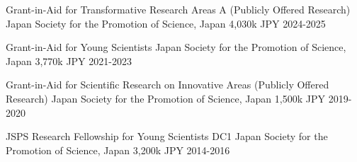 
\begin{cvhonors}

  \cvhonor
    {Grant-in-Aid for Transformative Research Areas A (Publicly Offered Research)} %
    {Japan Society for the Promotion of Science, Japan} %
    {4,030k JPY} %
    {2024-2025} %

\end{cvhonors}


\begin{cvhonors}

  \cvhonor
    {Grant-in-Aid for Young Scientists} %
    {Japan Society for the Promotion of Science, Japan} %
    {3,770k JPY} %
    {2021-2023} %
    
\end{cvhonors}


\begin{cvhonors}

  \cvhonor
    {Grant-in-Aid for Scientific Research on Innovative Areas (Publicly Offered Research)} %
    {Japan Society for the Promotion of Science, Japan} %
    {1,500k JPY} %
    {2019-2020} %
    
\end{cvhonors}

\begin{cvhonors}

  \cvhonor
    {JSPS Research Fellowship for Young Scientists DC1} %
    {Japan Society for the Promotion of Science, Japan} %
    {3,200k JPY} %
    {2014-2016} %
    
\end{cvhonors}